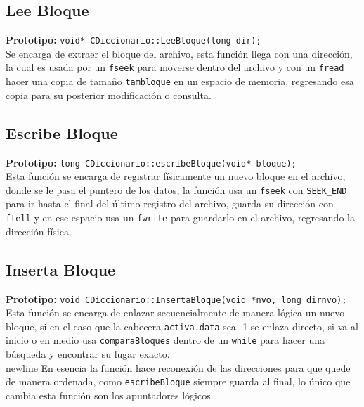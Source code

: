 \documentclass[12pt]{article}
\begin{document}
{}
\subsection*{Lee Bloque}
\textbf{Prototipo:} \verb|void* CDiccionario::LeeBloque(long dir);|\\
Se encarga de extraer el bloque del archivo, esta función 
llega con una dirección, la cual es usada por un 
\verb|fseek| para moverse dentro del archivo y con un 
\verb|fread| hacer una copia de tamaño \verb|tambloque| en un 
espacio de memoria, regresando esa copia para su posterior 
modificación o consulta.

{}
\subsection*{Escribe Bloque}
\textbf{Prototipo:} \verb|long CDiccionario::escribeBloque(void* bloque);|\\
Esta función se encarga de registrar físicamente un nuevo 
bloque en el archivo, donde se le pasa el puntero de los datos, 
la función usa un \verb|fseek| con \verb|SEEK_END| para ir 
hasta el final del último registro del archivo, guarda su 
dirección con \verb|ftell| y en ese espacio usa 
un \verb|fwrite| para guardarlo en el archivo, regresando la 
dirección física.

{}
\subsection*{Inserta Bloque}
\textbf{Prototipo:} \verb|void CDiccionario::InsertaBloque(void *nvo, long dirnvo);|\\
Esta función se encarga de enlazar secuencialmente de manera 
lógica un nuevo bloque, si en el caso que la cabecera 
\verb|activa.data| sea -1 se enlaza directo, si va al inicio o 
en medio usa \verb|comparaBloques| dentro de un \verb|while| 
para hacer una búsqueda y encontrar su lugar exacto.\\newline
En esencia la función hace reconexión de las direcciones para 
que quede de manera ordenada, como \verb|escribeBloque| 
siempre guarda al final, lo único que cambia esta función 
son los apuntadores lógicos.

\end{document}
